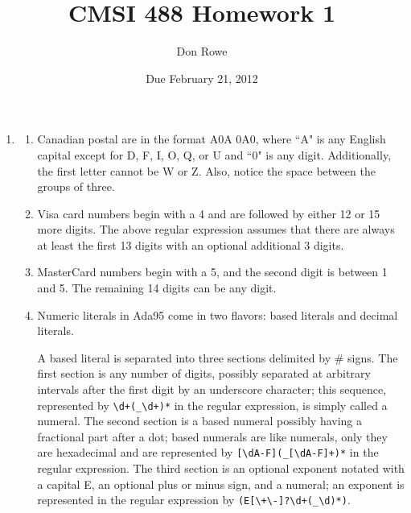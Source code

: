 \documentclass[landscape]{report}
\title{CMSI 488 Homework 1}
\author{Don Rowe}
\date{Due February 21, 2012}
\begin{document}
  \maketitle
  
  \begin{enumerate}
    \item %
    \begin{enumerate}
      \item %
        
        Canadian postal are in the format A0A 0A0, where ``A" is any English
        capital except for D, F, I, O, Q, or U and ``0" is any digit.
        Additionally, the first letter cannot be W or Z. Also, notice the
        space between the groups of three.
      \item %
        
        Visa card numbers begin with a 4 and are followed by either 12 or 15
        more digits. The above regular expression assumes that there are always
        at least the first 13 digits with an optional additional 3 digits.
      \item %
        
        MasterCard numbers begin with a 5, and the second digit is between 1
        and 5. The remaining 14 digits can be any digit.
      \item %
        
        Numeric literals in Ada95 come in two flavors: based literals and
        decimal literals.
        
        A based literal is separated into three sections
        delimited by \# signs. The first section is any number of digits,
        possibly separated at arbitrary intervals after the first digit by an
        underscore character; this sequence, represented by
        \lstinline`\d+(_\d+)*` in the regular expression, is simply called a
        numeral. The second section is a based numeral possibly having a
        fractional part after a dot; based numerals are like numerals, only
        they are hexadecimal and are represented by
        \lstinline`[\dA-F](_[\dA-F]+)*` in the regular expression. The third
        section is an optional exponent notated with a capital E, an optional
        plus or minus sign, and a numeral; an exponent is represented in the
        regular expression by \lstinline`(E[\+\-]?\d+(_\d)*)`.
        

\end{enumerate}
\end{enumerate}
\end{document}
